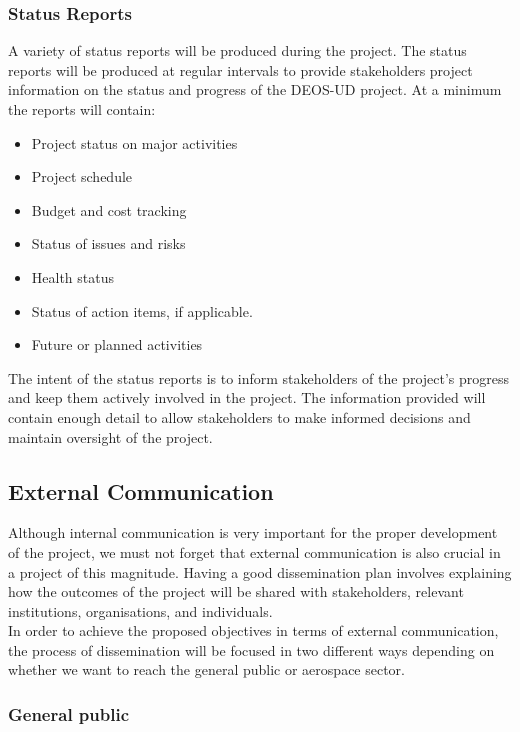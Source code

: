 \subsubsection{Status Reports}

A variety of status reports will be produced during the project. The status reports will be produced at regular intervals to provide stakeholders project information on the status and progress of the DEOS-UD project. At a minimum the reports will contain:
 \begin{itemize}
	\item Project status on major activities
	\item Project schedule
	\item Budget and cost tracking
	\item Status of issues and risks
	\item Health status	
	\item Status of action items, if applicable.
	\item Future or planned activities 
 \end{itemize}

The intent of the status reports is to inform stakeholders of the project’s progress and keep them actively involved in the project. The information provided will contain enough detail to allow stakeholders to make informed decisions and maintain oversight of the project.

\subsection{External Communication}

Although internal communication is very important for the proper development of the project, we must not forget that external communication is also crucial in a project of this magnitude. Having a good dissemination plan involves explaining how the outcomes of the project will be shared with stakeholders, relevant institutions, organisations, and individuals. \\
In order to achieve the proposed objectives in terms of external communication, the process of dissemination will be focused  in two different ways depending on whether we want to reach the general public or aerospace sector.

\subsubsection{General public}

